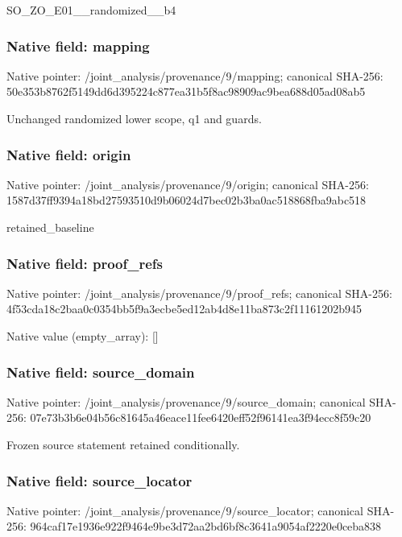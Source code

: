 \documentclass[10pt,a4paper]{article}
\begin{document}
\begingroup\raggedright\sloppy SO\_\allowbreak{}ZO\_\allowbreak{}E01\_\allowbreak{}\_\allowbreak{}randomized\_\allowbreak{}\_\allowbreak{}b4\par\endgroup

\subsubsection{Native field: mapping}
Native pointer: /joint\_\allowbreak{}analysis/provenance/9/mapping; canonical SHA-256: 50e353b8762f5149dd6d395224c877ea31b5f8ac98909ac9bea688d05ad08ab5

\begingroup\raggedright\sloppy Unchanged randomized lower scope,\allowbreak{} q1 and guards.\par\endgroup

\subsubsection{Native field: origin}
Native pointer: /joint\_\allowbreak{}analysis/provenance/9/origin; canonical SHA-256: 1587d37ff9394a18bd27593510d9b06024d7bec02b3ba0ac518868fba9abc518

\begingroup\raggedright\sloppy retained\_\allowbreak{}baseline\par\endgroup

\subsubsection{Native field: proof\_\allowbreak{}refs}
Native pointer: /joint\_\allowbreak{}analysis/provenance/9/proof\_\allowbreak{}refs; canonical SHA-256: 4f53cda18c2baa0c0354bb5f9a3ecbe5ed12ab4d8e11ba873c2f11161202b945

Native value (empty\_\allowbreak{}array): []

\subsubsection{Native field: source\_\allowbreak{}domain}
Native pointer: /joint\_\allowbreak{}analysis/provenance/9/source\_\allowbreak{}domain; canonical SHA-256: 07e73b3b6e04b56c81645a46eace11fee6420eff52f96141ea3f94ecc8f59c20

\begingroup\raggedright\sloppy Frozen source statement retained conditionally.\par\endgroup

\subsubsection{Native field: source\_\allowbreak{}locator}
Native pointer: /joint\_\allowbreak{}analysis/provenance/9/source\_\allowbreak{}locator; canonical SHA-256: 964caf17e1936e922f9464e9be3d72aa2bd6bf8c3641a9054af2220e0ceba838
\end{document}
